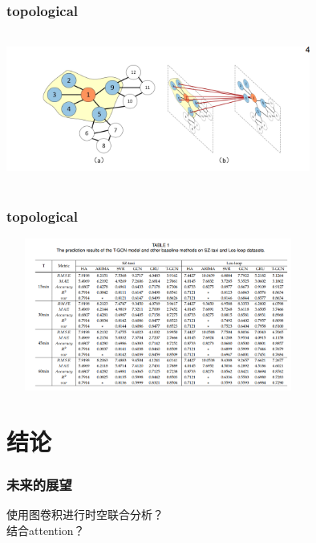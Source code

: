 \documentclass{beamer}
\begin{document}
\begin{frame}
    \frametitle{topological}
    \includegraphics[height=5cm, width=10cm]{images/topological.png}\\
\end{frame}

\begin{frame}
    \frametitle{topological}
    \includegraphics[height=5cm, width=10cm]{images/experiments.png}\\
\end{frame}

\section{结论}

\begin{frame}
    \frametitle{未来的展望}
    使用图卷积进行时空联合分析？\\
    结合attention？\\
\end{frame}
\end{document}
